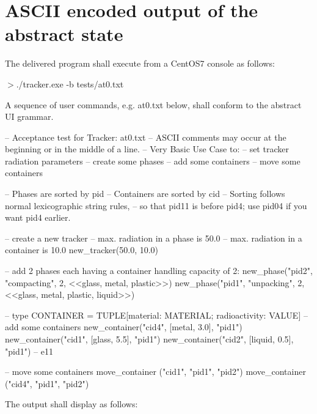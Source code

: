 \newpage
\section{ASCII encoded output of the abstract state}

The delivered program shall execute from a CentOS7 console as follows:

\begin{mdframed}
$>$./tracker.exe -b tests/at0.txt 
\end{mdframed}

A sequence of user commands, e.g. at0.txt below, shall conform to the abstract UI grammar.

\begin{code}
-- Acceptance test for Tracker: at0.txt 
-- ASCII comments may occur at the beginning or in the middle of a line.
-- Very Basic Use Case to:
--	set tracker radiation parameters
--	create some phases
--	add some containers
--	move some containers

-- Phases are sorted by pid
-- Containers are sorted by cid
-- Sorting follows normal lexicographic string rules,
-- so that pid11 is before pid4; use pid04 if you want pid4 earlier. 

-- create a new tracker
-- max. radiation in a phase is 50.0
-- max. radiation in a container is 10.0
new_tracker(50.0, 10.0)

-- add 2 phases each having a container handling capacity of 2:
new_phase("pid2", "compacting", 2, <<glass, metal, plastic>>)
new_phase("pid1", "unpacking", 2, <<glass, metal, plastic, liquid>>)

-- type CONTAINER = TUPLE[material: MATERIAL; radioactivity: VALUE]
-- add some containers
new_container("cid4", [metal,   3.0], "pid1")
new_container("cid1", [glass,   5.5], "pid1")
new_container("cid2", [liquid,  0.5], "pid1") -- e11

-- move some containers
move_container ("cid1", "pid1", "pid2")
move_container ("cid4", "pid1", "pid2")	
\end{code}


The output shall display as follows:

